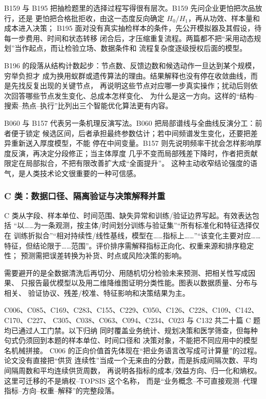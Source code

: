 \documentclass[UTF8,a4paper,12pt]{ctexart}
\begin{document}
B159 与 B195 把抽检题里的选择过程写得很有层次。B159 先问企业更怕把次品放行，还是
更怕把合格批拒收，由这一态度反向确定 $H_0/H_1$，再从功效、样本量和成本进入决策；
B195 面对没有真实抽检样本的条件，先公开模拟器及其假设，待每一步费用、时间和状态转移
闭合后，才压缩重复流程。两篇都不把“采用动态规划”当作起点，而让检验立场、数据条件和
流程复杂度逐级授权后面的模型。

B196 的段落从结构计数起步：节点数、反馈边数和候选动作一旦达到某个规模，穷举负担才
成为换用蚁群或遗传算法的理由。结果解释也没有停在收敛曲线，而是先找反复出现的关键节点，
再说明这些节点对应哪一步真实操作；扰动后则依次回答哪些节点发生变化、总成本怎样变化、
为什么是这一方向。这样的“结构--搜索--热点--执行”比列出三个智能优化算法更有内容。

B060 与 B157 代表另一条机理反演写法。B060 把局部谱线与全曲线反演分工：前者便于锁定
候选区间，后者承担最终参数估计；若中间频谱发生变化，还要把差异重新送入厚度模型，不能
停在中间变量。B157 则先说明频率干扰会怎样影响厚度反演，再决定分段修正；当主体厚度
几乎不变而局部残差下降时，作者把贡献限定在局部拟合，不把有限改善扩大成“全面提升”。
这种主动收窄结论强度的语气，是人类技术论文很重要的一种可信感。

\subsubsection{C 类：数据口径、隔离验证与决策解释并重}

C 类从字段、样本单位、时间范围、缺失异常和训练/验证边界写起。有效表达包括
“以……为一条观测，按主体/时间划分训练与验证集”“所有标准化和特征选择仅在
训练折拟合”“相对持续性/线性基线，模型在……指标上……”“该变化主要对应……
特征，但结论限于……范围”。评价排序需解释指标正向化、权重来源和排序稳定性；
预测需把误差转换为补货、时点或风险决策的影响。

需要避开的是全数据清洗后再切分、用随机切分检验未来预测、把相关性写成因果、
只报告最优模型以及用二维降维图证明分类性能。图表以数据质量、分布与相关、
验证协议、残差/校准、特征影响和决策结果为主。

C006、C085、C169、C283、C155、C229、C050、C126、C228、C109、C142、C170、C227、
C305、C038、C063、C094、C234、C023 与 C132 共二十篇 C 题均已通过人工门禁。以下归纳
同时覆盖业务统计、规划决策和医学筛查，但每种句式仍须回到本题的样本单位、时间口径和
决策对象，不能把不同应用中的模型名机械拼接。
C006 的正向价值首先体现在“把业务语言改写成可计算量”的过程。论文没有直接把“供货
连续性”当成一个无来由的分数，而是拆成间隔次数、平均间隔周数和平均连续供货周数，
再说明各指标的成本/效益方向、归一化和熵权。这里可迁移的不是熵权--TOPSIS 这个名称，
而是“业务概念--不可直接观测--代理指标--方向--权重--解释”的完整段落。
\end{document}
